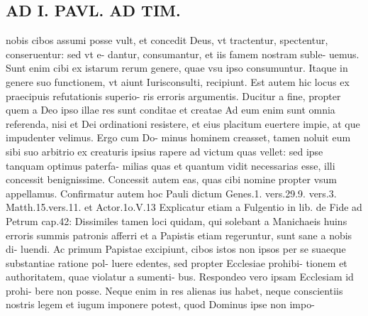 \documentclass{article}
\begin{document}
\begin{pages}
\section*{AD I. PAVL. AD TIM. }
\marginpar{[ p.192 ]}\pstart nobis cibos assumi posse vult, et concedit Deus, vt tractentur, spectentur, conseruentur: sed vt e- dantur, consumantur, et iis famem nostram suble- uemus. Sunt enim cibi ex istarum rerum genere, quae vsu ipso consumuntur. Itaque in genere suo functionem, vt aiunt Iurisconsulti, recipiunt. Est autem hic locus ex praecipuis refutationis superio- ris erroris argumentis. Ducitur a fine, propter quem a Deo ipso illae res sunt conditae et creatae Ad eum enim sunt omnia referenda, nisi et Dei ordinationi resistere, et eius placitum euertere impie, at que impudenter velimus. Ergo cum Do- minus hominem creasset, tamen noluit eum sibi suo arbitrio ex creaturis ipsius rapere ad victum quas vellet: sed ipse tanquam optimus paterfa- milias quas et quantum vidit necessarias esse, illi concessit benignissime. Concessit autem eas, quas cibi nomine propter vsum appellamus. Confirmatur autem hoc Pauli dictum Genes.1. vers.29.9. vers.3. Matth.15.vers.11. et Actor.1o.V.13 Explicatur etiam a Fulgentio in lib.  de Fide ad Petrum cap.42: Dissimiles tamen loci quidam, qui solebant a Manichaeis huins erroris summis patronis afferri et a Papistis etiam regeruntur, sunt sane a nobis di- luendi. Ac primum Papistae excipiunt, cibos istos non ipsos per se suaeque substantiae ratione pol- luere edentes, sed propter Ecclesiae prohibi- tionem et authoritatem, quae violatur a sumenti- bus. Respondeo vero ipsam Ecclesiam id prohi- bere non posse. Neque enim in res alienas ius habet, neque conscientiis nostris legem et iugum imponere potest, quod Dominus ipse non impo-  \pend

\end{pages}
\end{document}
